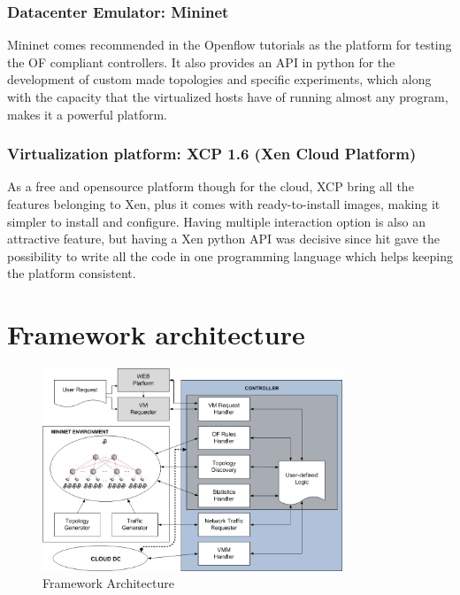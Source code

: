 \documentclass[12pt,english,oneside]{book}
\begin{document}
\subsubsection{Datacenter Emulator: Mininet}
\hspace{0.6cm}

Mininet comes recommended in the Openflow tutorials as the platform for testing the OF compliant controllers.
It also provides an API in python for the development of custom made topologies and specific experiments, which along with the capacity that the virtualized hosts have of running almost any program, makes it a powerful platform.

\subsubsection{Virtualization platform: XCP 1.6 (Xen Cloud Platform)}
\hspace{0.6cm}

As a free and opensource platform though for the cloud, XCP bring all the features belonging to Xen, plus it comes with ready-to-install images, making it simpler to install and configure.
Having multiple interaction option is also an attractive feature, but having a Xen python API was decisive since hit gave the possibility to write all the code in one programming language which helps keeping the platform consistent.
\newpage

\section{Framework architecture}
\hspace{0.6cm}

\begin{figure}[htbp]
        \centering
        \includegraphics[width=0.8\textwidth]{figures/emulator_new.png}
        \caption{Framework Architecture}
        \label{fig:framework}
\end{figure}
\end{document}
